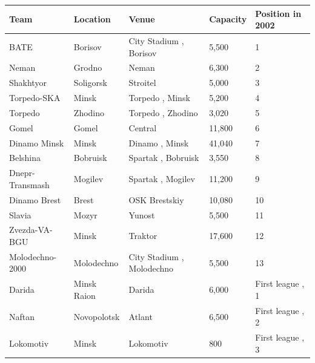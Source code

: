 \documentclass{article}
\begin{document}
\begin{tabular}{lllll}
\toprule
Team & Location & Venue & Capacity & Position in 2002 \\
\midrule
BATE & Borisov & City Stadium , Borisov & 5,500 & 1 \\
Neman & Grodno & Neman & 6,300 & 2 \\
Shakhtyor & Soligorsk & Stroitel & 5,000 & 3 \\
Torpedo-SKA & Minsk & Torpedo , Minsk & 5,200 & 4 \\
Torpedo & Zhodino & Torpedo , Zhodino & 3,020 & 5 \\
Gomel & Gomel & Central & 11,800 & 6 \\
Dinamo Minsk & Minsk & Dinamo , Minsk & 41,040 & 7 \\
Belshina & Bobruisk & Spartak , Bobruisk & 3,550 & 8 \\
Dnepr-Transmash & Mogilev & Spartak , Mogilev & 11,200 & 9 \\
Dinamo Brest & Brest & OSK Brestskiy & 10,080 & 10 \\
Slavia & Mozyr & Yunost & 5,500 & 11 \\
Zvezda-VA-BGU & Minsk & Traktor & 17,600 & 12 \\
Molodechno-2000 & Molodechno & City Stadium , Molodechno & 5,500 & 13 \\
Darida & Minsk Raion & Darida & 6,000 & First league , 1 \\
Naftan & Novopolotsk & Atlant & 6,500 & First league , 2 \\
Lokomotiv & Minsk & Lokomotiv & 800 & First league , 3 \\
\bottomrule
\end{tabular}
\end{document}
